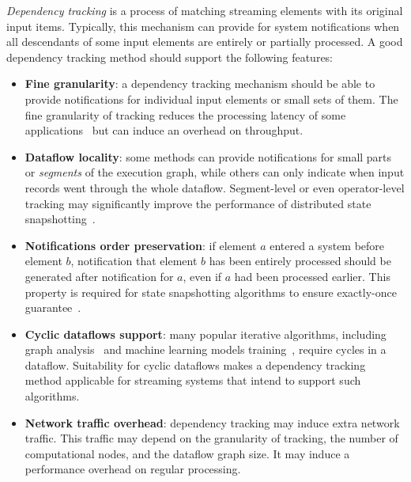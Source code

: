 {\em Dependency tracking} is a process of matching streaming elements with its original input items. Typically, this mechanism can provide for system notifications when all descendants of some input elements are entirely or partially processed. A good dependency tracking method should support the following features:
\begin{itemize}
    \item {\bf Fine granularity}: a dependency tracking mechanism should be able to provide notifications for individual input elements or small sets of them. The fine granularity of tracking reduces the processing latency of some applications~\cite{we2018adbis} but can induce an overhead on throughput.
    \item {\bf Dataflow locality}: some methods can provide notifications for small parts or {\em segments} of the execution graph, while others can only indicate when input records went through the whole dataflow. Segment-level or even operator-level tracking may significantly improve the performance of distributed state snapshotting~\cite{Carbone:2017:SMA:3137765.3137777, 2015arXiv150608603C}.
    \item {\bf Notifications order preservation}: if element $a$ entered a system before element $b$, notification that element $b$ has been entirely processed should be generated after notification for $a$, even if $a$ had been processed earlier. This property is required for state snapshotting algorithms to ensure exactly-once guarantee~\cite{2015arXiv150608603C}.
    \item {\bf Cyclic dataflows support}: many popular iterative algorithms, including graph analysis~\cite{xu2016efficient} and machine learning models training~\cite{morales2015samoa}, require cycles in a dataflow. Suitability for cyclic dataflows makes a dependency tracking method applicable for streaming systems that intend to support such algorithms.
    \item {\bf Network traffic overhead}: dependency tracking may induce extra network traffic. This traffic may depend on the granularity of tracking, the number of computational nodes, and the dataflow graph size. It may induce a performance overhead on regular processing.
\end{itemize}

